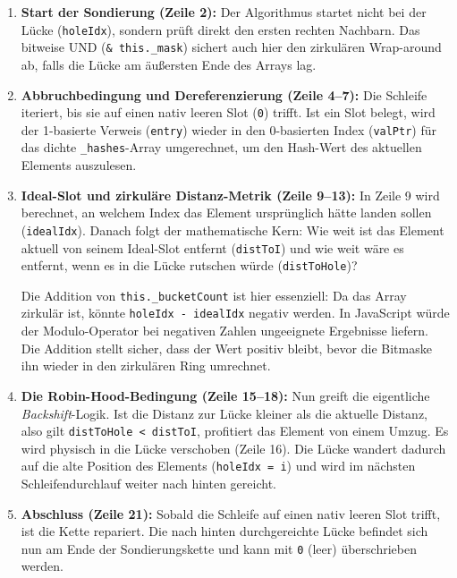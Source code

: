 \begin{enumerate}
    \item \textbf{Start der Sondierung (Zeile 2):} Der Algorithmus startet nicht bei der Lücke (\texttt{holeIdx}), sondern prüft direkt den ersten rechten Nachbarn. Das bitweise UND (\texttt{& this._mask}) sichert auch hier den zirkulären Wrap-around ab, falls die Lücke am äußersten Ende des Arrays lag.
    
    \item \textbf{Abbruchbedingung und Dereferenzierung (Zeile 4–7):} Die Schleife iteriert, bis sie auf einen nativ leeren Slot (\texttt{0}) trifft. Ist ein Slot belegt, wird der 1-basierte Verweis (\texttt{entry}) wieder in den 0-basierten Index (\texttt{valPtr}) für das dichte \texttt{_hashes}-Array umgerechnet, um den Hash-Wert des aktuellen Elements auszulesen.
    
    \item \textbf{Ideal-Slot und zirkuläre Distanz-Metrik (Zeile 9–13):} In Zeile 9 wird berechnet, an welchem Index das Element ursprünglich hätte landen sollen (\texttt{idealIdx}). Danach folgt der mathematische Kern: Wie weit ist das Element aktuell von seinem Ideal-Slot entfernt (\texttt{distToI}) und wie weit wäre es entfernt, wenn es in die Lücke rutschen würde (\texttt{distToHole})? 
    
    Die Addition von \texttt{this._bucketCount} ist hier essenziell: Da das Array zirkulär ist, könnte \texttt{holeIdx - idealIdx} negativ werden. In JavaScript würde der Modulo-Operator bei negativen Zahlen ungeeignete Ergebnisse liefern. Die Addition stellt sicher, dass der Wert positiv bleibt, bevor die Bitmaske ihn wieder in den zirkulären Ring umrechnet.
    
    \item \textbf{Die Robin-Hood-Bedingung (Zeile 15–18):} Nun greift die eigentliche \textit{Backshift}-Logik. Ist die Distanz zur Lücke kleiner als die aktuelle Distanz, also gilt \texttt{distToHole < distToI}, profitiert das Element von einem Umzug. Es wird physisch in die Lücke verschoben (Zeile 16). Die Lücke wandert dadurch auf die alte Position des Elements (\texttt{holeIdx = i}) und wird im nächsten Schleifendurchlauf weiter nach hinten gereicht.
    
    \item \textbf{Abschluss (Zeile 21):} Sobald die Schleife auf einen nativ leeren Slot trifft, ist die Kette repariert. Die nach hinten durchgereichte Lücke befindet sich nun am Ende der Sondierungskette und kann mit \texttt{0} (leer) überschrieben werden.
\end{enumerate}

